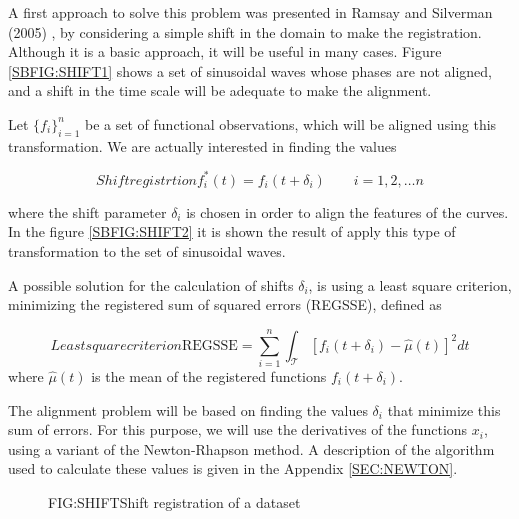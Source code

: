 A first approach to solve this problem was presented in Ramsay and Silverman
(2005) \cite{Ramsay2005}, by considering a simple shift in the domain to make the
registration. Although it is a basic approach, it will be useful in many cases.
Figure \ref{SBFIG:SHIFT1} shows a set of sinusoidal waves whose phases are not
aligned, and a shift in the time scale will be adequate to make the alignment.

Let $\{f_i\}_{i=1}^n$ be a set of functional observations, which will be aligned
using this transformation. We are actually interested in finding the values

\begin{equation}[EQN:SHIFTS]{Shift registrtion}
f_i^*(t)=f_i(t+ \delta_i) \qquad i=1,2, \dots n
\end{equation}

where the shift parameter $\delta_i$ is chosen in order to align the features of
the curves. In the figure \ref{SBFIG:SHIFT2} it is shown the result of apply
this type of transformation to the set of sinusoidal waves.


A possible solution for the calculation of shifts $\delta_i$, is using a least
square criterion, minimizing the registered sum of squared errors (REGSSE),
defined as

\begin{equation}[EQ:REGSSE]{Least square criterion}
\text{REGSSE} = \sum_{i=1}^{n}\int_{\mathcal{T}}\left [f_i(t+\delta_i) - \hat \mu(t) \right ]^2 dt
\end{equation}
where $\hat \mu(t)$ is the mean of the registered functions $f_i(t+\delta_i)$.

The alignment problem will be based on finding the values $\delta_i$ that
minimize this sum of errors. For this purpose,
we will use the derivatives of the functions $x_i$, using a variant of the
Newton-Rhapson method. A description of the algorithm used to calculate these
values is given in the Appendix \ref{SEC:NEWTON}.

\begin{figure}[Shift registration of a dataset]{FIG:SHIFT}{Shift registration of a dataset}
	 \quad
\end{figure}
